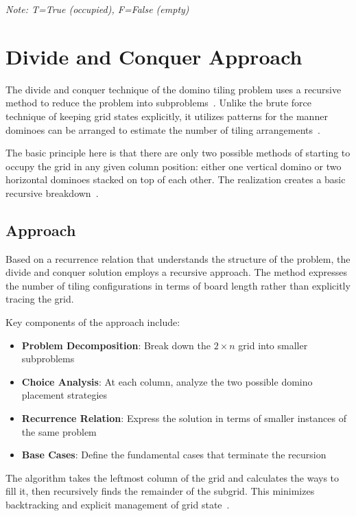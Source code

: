\documentclass[conference]{IEEEtran}
\begin{document}
\textit{Note: T=True (occupied), F=False (empty)}


\section{Divide and Conquer Approach}

The divide and conquer technique of the domino tiling problem uses a recursive method to reduce the problem into subproblems~\cite{b1, b2}. Unlike the brute force technique of keeping grid states explicitly, it utilizes patterns for the manner dominoes can be arranged to estimate the number of tiling arrangements~\cite{b2}.

The basic principle here is that there are only two possible methods of starting to occupy the grid in any given column position: either one vertical domino or two horizontal dominoes stacked on top of each other. The realization creates a basic recursive breakdown~\cite{b1, b5}.

\subsection{Approach}

Based on a recurrence relation that understands the structure of the problem, the divide and conquer solution employs a recursive approach. The method expresses the number of tiling configurations in terms of board length rather than explicitly tracing the grid.

Key components of the approach include:

\begin{itemize}
    \item \textbf{Problem Decomposition}: Break down the $2 \times n$ grid into smaller subproblems
    \item \textbf{Choice Analysis}: At each column, analyze the two possible domino placement strategies
    \item \textbf{Recurrence Relation}: Express the solution in terms of smaller instances of the same problem
    \item \textbf{Base Cases}: Define the fundamental cases that terminate the recursion
\end{itemize}

The algorithm takes the leftmost column of the grid and calculates the ways to fill it, then recursively finds the remainder of the subgrid. This minimizes backtracking and explicit management of grid state~\cite{b2, b3}.
\end{document}
